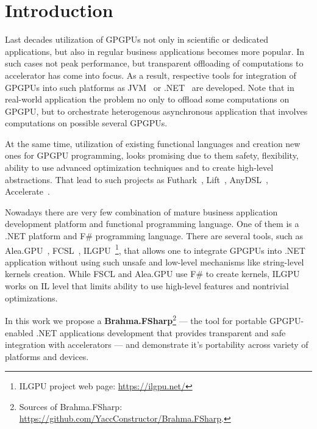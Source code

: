 \section{Introduction}

Last decades utilization of GPGPUs not only in scientific or dedicated applications, but also in regular business applications becomes more popular.
In such cases not peak performance, but transparent offloading of computations to accelerator has come into focus.
As a result, respective tools for integration of GPGPUs into such platforms as JVM~\cite{rootbeer,jcuda,ScalaGPU} or .NET~\cite{FSCLPhD,aleaGPUasync} are developed.
Note that in real-world application the problem no only to offload some computations on GPGPU, but to orchestrate heterogenous asynchronous application that involves computations on possible several GPGPUs.

At the same time, utilization of existing functional languages and creation new ones for GPGPU programming, looks promising due to them safety, flexibility, ability to use advanced optimization techniques and to create high-level abstractions.
That lead to such projects as Futhark~\cite{10.1145/3140587.3062354}, Lift~\cite{10.5555/3049832.3049841}, AnyDSL~\cite{10.1145/3276489}, Accelerate~\cite{10.1145/1926354.1926358}.
 
Nowadays there are very few combination of mature business application development platform and functional programming language.
One of them is a .NET platform and F\# programming language. 
There are several tools, such as Alea.GPU~\cite{aleaGPUasync}, FCSL~\cite{FSCLPhD}, ILGPU~\footnote{ILGPU project web page: \url{https://ilgpu.net/}}, that allows one to integrate GPGPUs into .NET application without using such unsafe and low-level mechanisms like string-level kernels creation. 
While FSCL and Alea.GPU use F\# to create kernels, ILGPU works on IL level that limits ability to use high-level features and nontrivial optimizations.
 
In this work we propose a \textbf{Brahma.FSharp}\footnote{
    Sources of Brahma.FSharp: \url{https://github.com/YaccConstructor/Brahma.FSharp}.
} --- the tool for portable GPGPU-enabled .NET applications development that provides transparent and safe integration with accelerators --- and demonstrate it's portability across variety of platforms and devices. 